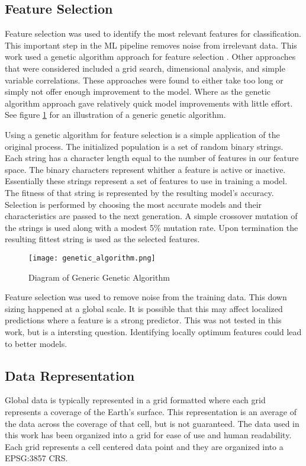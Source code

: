 \subsection{Feature Selection}
Feature selection was used to identify the most relevant features for classification.
This important step in the \ac{ML} pipeline removes noise from irrelevant data.
This work used a genetic algorithm approach for feature selection \cite{yang1998feature}.
Other approaches that were considered included a grid search, dimensional analysis, and simple variable correlations.
These approaches were found to either take too long or simply not offer enough improvement to the model.
Where as the genetic algorithm approach gave relatively quick model improvements with little effort.
See figure \ref{fig:GA} for an illustration of a generic genetic algorithm.

\par
Using a genetic algorithm for feature selection is a simple application of the original process.
The initialized population is a set of random binary strings.
Each string has a character length equal to the number of features in our feature space.
The binary characters represent whither a feature is active or inactive.
Essentially these strings represent a set of features to use in training a model.
The fitness of that string is represented by the resulting model's accuracy.
Selection is performed by choosing the most accurate models and their characteristics are passed to the next generation.
A simple crossover mutation of the strings is used along with a modest 5\% mutation rate.
Upon termination the resulting fittest string is used as the selected features.


\begin{figure}[h]
    \centering
    \caption{Diagram of Generic Genetic Algorithm}
    \label{fig:GA}
    \texttt{[image: genetic\_algorithm.png]}
\end{figure}

\par
Feature selection was used to remove noise from the training data.
This down sizing happened at a global scale.
It is possible that this may affect localized predictions where a feature is a strong predictor.
This was not tested in this work, but is a intersting question.
Identifying locally optimum features could lead to better models.


\subsection{Data Representation}
Global data is typically represented in a grid formatted where each grid represents a coverage of the Earth's surface.
This representation is an average of the data across the coverage of that cell, but is not guaranteed.
The data used in this work has been organized into a grid for ease of use and human readability.
Each grid represents a cell centered data point and they are organized into a EPSG:3857 \ac{CRS}.

